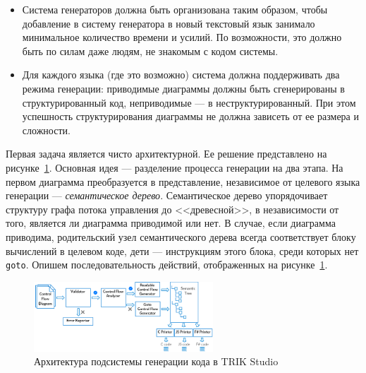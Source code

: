 \documentclass[conference]{IEEEtran}
\begin{document}
\begin{itemize}
    \item Система генераторов должна быть организована таким образом, чтобы добавление в систему генератора в новый текстовый язык занимало минимальное количество времени и усилий. По возможности, это должно быть по силам даже людям, не знакомым с кодом системы.
    \item Для каждого языка (где это возможно) система должна поддерживать два режима генерации: приводимые диаграммы должны быть сгенерированы в структурированный код, неприводимые --- в неструктурированный. При этом успешность структурирования диаграммы не должна зависеть от ее размера и сложности.
\end{itemize}

Первая задача является чисто архитектурной. Ее решение представлено на рисунке~\ref{image:generatorsArchitecture}. Основная идея --- разделение процесса генерации на два этапа. На первом диаграмма преобразуется в представление, независимое от целевого языка генерации --- \textit{семантическое дерево}. Семантическое дерево упорядочивает структуру графа потока управления до <<древесной>>, в независимости от того, является ли диаграмма приводимой или нет. В случае, если диаграмма приводима, родительский узел семантического дерева всегда соответствует блоку вычислений в целевом коде, дети --- инструкциям этого блока, среди которых нет \texttt{goto}. Опишем последовательность действий, отображенных на рисунке~\ref{image:generatorsArchitecture}.

\begin{figure}[ht]
    \centering
    \includegraphics[width=0.6\textwidth]{TS_Generators_Architecture.png}
    \caption{Архитектура подсистемы генерации кода в TRIK Studio}
    \label{image:generatorsArchitecture}
\end{figure}
\end{document}

